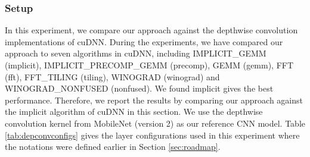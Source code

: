 %	
%


\subsubsection{Setup} In this experiment, we compare our approach against the depthwise convolution implementations of cuDNN.
During the experiments, we have compared our approach to seven algorithms in cuDNN, including IMPLICIT\_GEMM (implicit),
IMPLICIT\_PRECOMP\_GEMM (precomp), GEMM (gemm), FFT (fft), FFT\_TILING (tiling), WINOGRAD (winograd) and WINOGRAD\_NONFUSED (nonfused). We
found implicit gives the best performance. Therefore, we report the results by comparing our approach against  the implicit algorithm of
cuDNN in this section. We use the depthwise convolution kernel from MobileNet (version 2) as our reference CNN model. Table
\ref{tab:depconvconfigs} gives the layer configurations used in this experiment where the notations were defined earlier in Section
\ref{sec:roadmap}.


